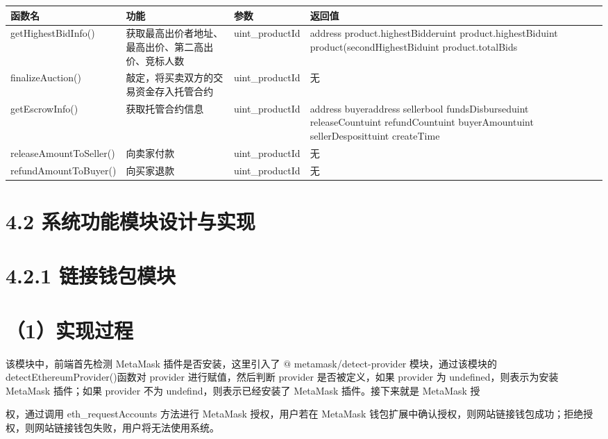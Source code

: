 \documentclass[
  10
]{article}
\newcounter{none} %
\begin{document}
{\def\LTcaptype{none} %
\begin{longtable}[]{@{}|l|l|l|l|@{}}
\toprule\noalign{}
\endhead
\bottomrule\noalign{}
\endlastfoot
\hline
函数名 & 功能 & 参数 & 返回值 \\
\hline
getHighestBidInfo() & 获取最高出价者地址、最高出价、第二高出价、竞标人数
& uint\_productId & address product.highestBidderuint
product.highestBiduint product(secondHighestBiduint product.totalBids \\
\hline
finalizeAuction() & 敲定，将买卖双方的交易资金存入托管合约 &
uint\_productId & 无 \\
\hline
getEscrowInfo() & 获取托管合约信息 & uint\_productId & address
buyeraddress sellerbool fundsDisburseduint releaseCountuint
refundCountuint buyerAmountuint sellerDesposittuint createTime \\
\hline
releaseAmountToSeller() & 向卖家付款 & uint\_productId & 无 \\
\hline
refundAmountToBuyer() & 向买家退款 & uint\_productId & 无 \\
\hline
\end{longtable}
}

\section{4.2
系统功能模块设计与实现}\label{ux7cfbux7edfux529fux80fdux6a21ux5757ux8bbeux8ba1ux4e0eux5b9eux73b0}

\section{4.2.1
链接钱包模块}\label{ux94feux63a5ux94b1ux5305ux6a21ux5757-1}

\section{（1）实现过程}\label{ux5b9eux73b0ux8fc7ux7a0b}

该模块中，前端首先检测 MetaMask 插件是否安装，这里引入了 \(@\)
metamask/detect-provider 模块，通过该模块的
detectEthereumProvider()函数对 provider 进行赋值，然后判断 provider
是否被定义，如果 provider 为 undefined，则表示为安装 MetaMask 插件；如果
provider 不为 undefind，则表示已经安装了 MetaMask 插件。接下来就是
MetaMask 授

权，通过调用 eth\_requestAccounts 方法进行 MetaMask 授权，用户若在
MetaMask
钱包扩展中确认授权，则网站链接钱包成功；拒绝授权，则网站链接钱包失败，用户将无法使用系统。
\end{document}
